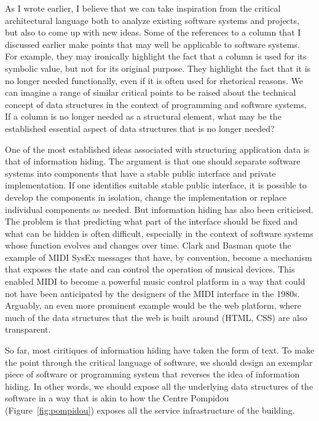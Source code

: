 As I wrote earlier, I believe that we can take inspiration from the critical architectural
language both to analyze existing software systems and projects, but also to come up with
new ideas. Some of the references to a column that I discussed earlier make points that
may well be applicable to software systems. For example, they may ironically highlight the fact
that a column is used for its symbolic value, but not for its original purpose.
They highlight the fact that it is no longer needed functionally, even if it is often used
for rhetorical reasons.
We can imagine a range of similar critical points to be raised about the technical concept
of data structures in the context of programming and software systems. If a column is no longer
needed as a structural element, what may be the established essential aspect of data structures
that is no longer needed?

One of the most established ideas associated with structuring application data is that of
information hiding.
The argument is that one should separate software systems into components that have a stable
public interface and private implementation. If one identifies suitable stable public interface,
it is possible to develop the components in isolation, change the implementation or replace
individual components as needed. But information hiding has also been criticised. The problem is
that predicting what part of the interface should be fixed and what can be hidden is often
difficult, especially in the context of software systems whose function evolves and changes
over time. Clark and Basman quote the example of MIDI SysEx messages that
have, by convention, become a mechanism that exposes the state and can control the operation
of musical devices. This enabled MIDI to become a powerful music control platform in a way
that could not have been anticipated by the designers of the MIDI interface in the 1980s.
Arguably, an even more prominent example would be the web platform, where much of the data
structures that the web is built around (HTML, CSS) are also transparent.

So far, most ciritiques of information hiding have taken the form of text. To make the point
through the critical language of software, we should design an exemplar piece of software
or programming system that reverses the idea of information hiding. In other words, we
should expose all the underlying data structures of the software in a way that is akin to how
the Centre Pompidou (Figure~\ref{fig:pompidou}) exposes all the service infrastructure of the
building.

